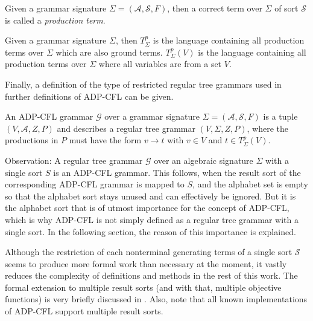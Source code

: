 \documentclass[
    a4paper,
    12pt,
    twoside,
    BCOR=12mm,
    parskip=half,
    chapterprefix,
    numbers=noenddot,
    bibliography=totoc
]{scrbook}
\begin{document}
\begin{definition}
	Given a grammar signature $\Sigma=(\mathcal{A},\mathcal{S},F)$, then a correct term over $\Sigma$ of sort $\mathcal{S}$ is called a \emph{production term}.
\end{definition}

Given a grammar signature $\Sigma$, then $T^p_\Sigma$ is the language containing all production terms over $\Sigma$ which are also ground terms.
$T^p_\Sigma(V)$ is the language containing all production terms over $\Sigma$ where all variables are from a set $V$.

Finally, a definition of the type of restricted regular tree grammars used in further definitions of ADP-CFL can be given.

\begin{definition}
	\label{def:tree_grammar}
	An ADP-CFL grammar $\mathcal{G}$ over a grammar signature $\Sigma=(\mathcal{A},\mathcal{S},F)$ is a tuple $(V,\mathcal{A},Z,P)$ and describes a regular tree grammar $(V,\Sigma,Z,P)$, where the productions in $P$ must have the form $v \to t$ with $v \in V$ and $t \in T^p_\Sigma (V)$.
\end{definition}

Observation: A regular tree grammar $\mathcal{G}$ over an algebraic signature $\Sigma$ with a single sort $S$ is an ADP-CFL grammar. This follows, when the result sort of the corresponding ADP-CFL grammar is mapped to $S$, and the alphabet set is empty so that the alphabet sort stays unused and can effectively be ignored. But it is the alphabet sort that is of utmost importance for the concept of ADP-CFL, which is why ADP-CFL is not simply defined as a regular tree grammar with a single sort. In the following section, the reason of this importance is explained.

\begin{remark}
	Although the restriction of each nonterminal generating terms of a single sort $\mathcal{S}$ seems to produce more formal work than necessary at the moment, it vastly reduces the complexity of definitions and methods in the rest of this work. The formal extension to multiple result sorts (and with that, multiple objective functions) is very briefly discussed in \citet[sect. 2.2.2]{sauthoff_bellmans_2011-1}. Also, note that all known implementations of ADP-CFL support multiple result sorts.	
\end{remark}
\end{document}
